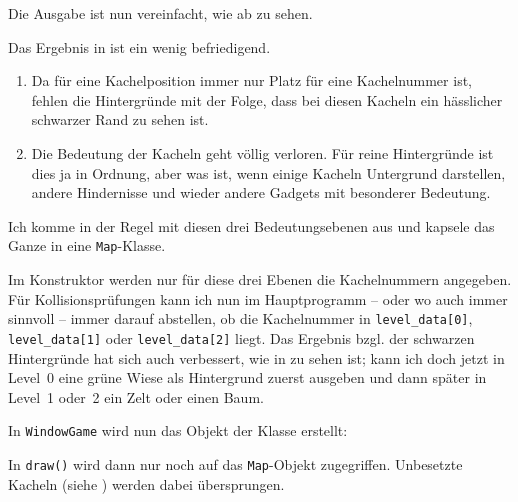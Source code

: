 Die Ausgabe ist nun vereinfacht, wie ab  zu sehen.


Das Ergebnis in  ist ein wenig befriedigend. 
\begin{enumerate}
	\item Da für eine Kachelposition immer nur Platz für eine Kachelnummer ist, fehlen die Hintergründe mit der Folge, dass bei diesen Kacheln ein hässlicher schwarzer Rand zu sehen ist.
	\item Die Bedeutung der Kacheln geht völlig verloren. Für reine Hintergründe ist dies ja in Ordnung, aber was ist, wenn einige Kacheln Untergrund darstellen, andere Hindernisse und wieder andere Gadgets mit besonderer Bedeutung.
\end{enumerate}

Ich komme in der Regel mit diesen drei Bedeutungsebenen aus und kapsele das Ganze in eine \texttt{Map}-Klasse. 

Im Konstruktor werden nur für diese drei Ebenen die Kachelnummern angegeben. Für Kollisionsprüfungen kann ich nun im Hauptprogramm -- oder wo auch immer sinnvoll -- immer darauf abstellen, ob die Kachelnummer in \texttt{level\_data[0]}, \texttt{level\_data[1]} oder \texttt{level\_data[2]} liegt. Das Ergebnis bzgl. der schwarzen Hintergründe hat sich auch verbessert, wie in  zu sehen ist; kann ich doch jetzt in Level~0 eine grüne Wiese als Hintergrund zuerst ausgeben und dann später in Level~1 oder~2 ein Zelt oder einen Baum.


In \texttt{WindowGame} wird nun das Objekt der Klasse erstellt:


In \texttt{draw()} wird dann nur noch auf das \texttt{Map}-Objekt zugegriffen. Unbesetzte Kacheln (siehe ) werden dabei übersprungen.



